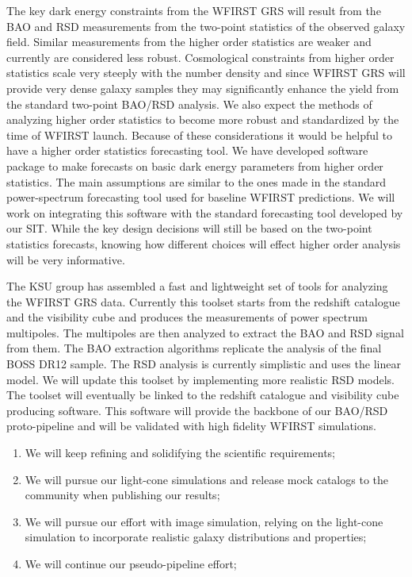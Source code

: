  The key dark energy constraints from the WFIRST GRS will result from the BAO and
 RSD measurements from the two-point statistics of the observed galaxy field.
 Similar measurements from the higher order statistics are weaker and currently
 are considered less robust. Cosmological constraints from higher order
 statistics scale very steeply with the number density and since WFIRST GRS will
 provide very dense galaxy samples they may significantly enhance the yield from
 the standard two-point BAO/RSD analysis. We also expect the methods of analyzing
 higher order statistics to become more robust and standardized by the time of
 WFIRST launch. Because of these considerations it would be helpful to have a
 higher order statistics forecasting tool. We have developed software package to
 make forecasts on basic dark energy parameters from higher order statistics.
 The main assumptions are similar to the ones made in the standard
 power-spectrum forecasting tool used for baseline WFIRST predictions. We will
 work on integrating this software with the standard forecasting tool developed
 by our SIT. While the key design decisions will still be based on the
 two-point statistics forecasts, knowing how different choices will effect higher
 order analysis will be very informative.

 The KSU group has assembled a fast and lightweight set of tools for analyzing
 the WFIRST GRS data. Currently this toolset starts from the redshift catalogue
 and the visibility cube and produces the measurements of power spectrum
 multipoles. The multipoles are then analyzed to extract the BAO and RSD signal
 from them. The BAO extraction algorithms replicate the analysis of the final
 BOSS DR12 sample. The RSD analysis is currently simplistic and uses the linear
 model. We will update this toolset by implementing more realistic RSD models.
 The toolset will eventually be linked to the redshift catalogue and visibility
 cube producing software. This software will provide the backbone of our BAO/RSD
 proto-pipeline and will be validated with high fidelity WFIRST simulations.


 \begin{summary}[]
 \begin{enumerate}
 \item We will keep refining and solidifying the scientific requirements;
 \item We will pursue our light-cone simulations and release mock catalogs to the community when publishing our results;
 \item We will pursue our effort with image simulation, relying on the light-cone simulation to incorporate realistic galaxy distributions and properties;
 \item We will continue our pseudo-pipeline effort;
 \end{enumerate}
 \end{summary}
